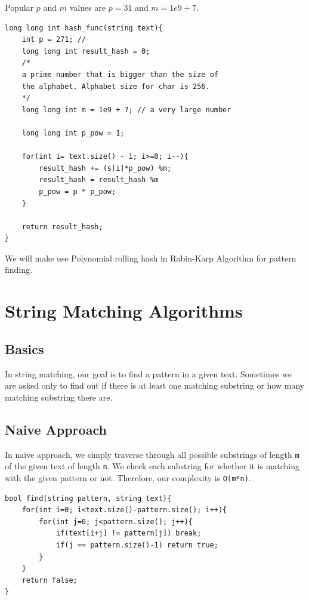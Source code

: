 \documentclass[12pt]{article}
\begin{document}
        Popular $p$ and $m$ values are $p = 31$ and $m = 1e9 + 7$.
        
        \begin{verbatim}
long long int hash_func(string text){
    int p = 271; // 
    long long int result_hash = 0;
    /*
    a prime number that is bigger than the size of 
    the alphabet. Alphabet size for char is 256.
    */
    long long int m = 1e9 + 7; // a very large number
    
    long long int p_pow = 1;
    
    for(int i= text.size() - 1; i>=0; i--){
        result_hash += (s[i]*p_pow) %m;
        result_hash = result_hash %m
        p_pow = p * p_pow;
    }

    return result_hash;
}
        \end{verbatim}
        
         We will make use Polynomial rolling hash in Rabin-Karp Algorithm for pattern finding.
        \newpage
        \section{String Matching Algorithms}
        
        \subsection{Basics}
        
        In string matching, our goal is to find a pattern in a given text. Sometimes we are asked only to find out if there is at least one matching substring or how many matching substring there are.
        
        \subsection{Naive Approach}
        In naive approach, we simply traverse through all possible substrings of length \texttt{m} of the given text of length \texttt{n}. We check each substring for whether it is matching with the given pattern or not. Therefore, our complexity is \texttt{O(m*n)}.
        
        \begin{verbatim}
bool find(string pattern, string text){
    for(int i=0; i<text.size()-pattern.size(); i++){
        for(int j=0; j<pattern.size(); j++){
            if(text[i+j] != pattern[j]) break;
            if(j == pattern.size()-1) return true;
        }
    }
    return false;
}
        \end{verbatim}
        
\end{document}
